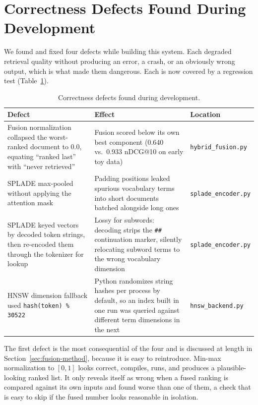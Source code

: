 \documentclass[11pt]{article}
\begin{document}
\section{Correctness Defects Found During Development}
\label{sec:correctness}

We found and fixed four defects while building this system. Each degraded retrieval quality without producing an error, a crash, or an obviously wrong output, which is what made them dangerous. Each is now covered by a regression test (Table~\ref{tab:defects}).

\begin{table}[h]
\centering
\caption{Correctness defects found during development.}
\label{tab:defects}
\small
\begin{tabular}{p{4.7cm}p{5.3cm}p{2.3cm}}
\toprule
Defect & Effect & Location \\
\midrule
Fusion normalization collapsed the worst-ranked document to 0.0, equating ``ranked last'' with ``never retrieved'' & Fusion scored below its own best component (0.640 vs.\ 0.933 nDCG@10 on early toy data) & \texttt{hybrid\_fusion.py} \\
SPLADE max-pooled without applying the attention mask & Padding positions leaked spurious vocabulary terms into short documents batched alongside long ones & \texttt{splade\_encoder.py} \\
SPLADE keyed vectors by decoded token strings, then re-encoded them through the tokenizer for lookup & Lossy for subwords: decoding strips the \texttt{\#\#} continuation marker, silently relocating subword terms to the wrong vocabulary dimension & \texttt{splade\_encoder.py} \\
HNSW dimension fallback used \texttt{hash(token) \% 30522} & Python randomizes string hashes per process by default, so an index built in one run was queried against different term dimensions in the next & \texttt{hnsw\_backend.py} \\
\bottomrule
\end{tabular}
\end{table}

The first defect is the most consequential of the four and is discussed at length in Section~\ref{sec:fusion-method}, because it is easy to reintroduce. Min-max normalization to $[0,1]$ looks correct, compiles, runs, and produces a plausible-looking ranked list. It only reveals itself as wrong when a fused ranking is compared against its own inputs and found worse than one of them, a check that is easy to skip if the fused number looks reasonable in isolation.
\end{document}
